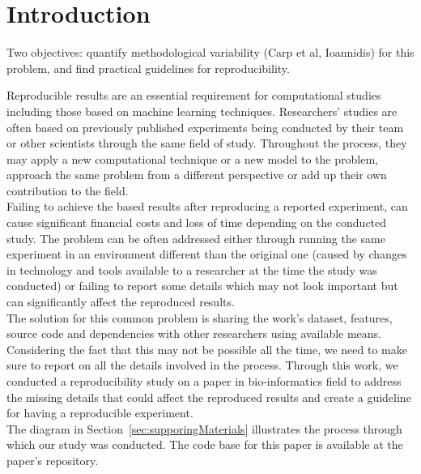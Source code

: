\section {Introduction}


Two objectives: quantify methodological variability (Carp et al, Ioannidis) for this problem,
and find practical guidelines for reproducibility.



Reproducible results are an essential requirement for computational studies including those based on machine learning techniques. 
Researchers' studies are often based on previously published experiments being conducted by their team or other scientists 
through the same field of study. 
Throughout the process, they may apply a new computational technique or a new model to the problem, 
approach the same problem from a different perspective or add up their own contribution to the field. \\

Failing to achieve the based results after reproducing a reported experiment, can cause significant financial costs 
and loss of time depending on the conducted study. The problem can be often addressed either through running the same 
experiment in an environment different than the original one (caused by changes in technology and tools available to a 
researcher at the time the study was conducted) or failing to report some details which may not look important but 
can significantly affect the reproduced results. \\

The solution for this common problem is sharing the work's dataset, features, source code and dependencies with other 
researchers using available means. Considering the fact that this may not be possible all the time, we need to make 
sure to report on all the details involved in the process. Through this work, we conducted a reproducibility study on a paper 
in bio-informatics field to address the missing details that could affect the reproduced results and create a guideline for 
having a reproducible experiment.\\

The diagram in Section~\ref{sec:supporingMaterials} illustrates the process through which our study was conducted. The code base for 
this paper is available at the paper's  repository.
